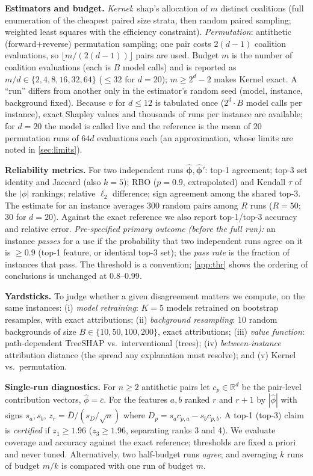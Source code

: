 \documentclass{article}
\newcommand{\phihat}{\hat{\boldsymbol\phi}}
\begin{document}
\textbf{Estimators and budget.} \emph{Kernel}: shap's allocation of $m$ distinct coalitions (full enumeration of the cheapest paired size strata, then random paired sampling; weighted least squares with the efficiency constraint). \emph{Permutation}: antithetic (forward+reverse) permutation sampling; one pair costs $2(d{-}1)$ coalition evaluations, so $\lfloor m/(2(d{-}1))\rfloor$ pairs are used. Budget $m$ is the number of coalition evaluations (each is $B$ model calls) and is reported as $m/d\in\{2,4,8,16,32,64\}$ ($\le32$ for $d{=}20$); $m\ge2^d-2$ makes Kernel exact. A ``run'' differs from another only in the estimator's random seed (model, instance, background fixed). Because $v$ for $d\le12$ is tabulated once ($2^d\!\cdot\!B$ model calls per instance), exact Shapley values and thousands of runs per instance are available; for $d{=}20$ the model is called live and the reference is the mean of 20 permutation runs of $64d$ evaluations each (an approximation, whose limits are noted in \cref{sec:limits}).

\textbf{Reliability metrics.} For two independent runs $\phihat,\phihat'$: top-1 agreement; top-3 set identity and Jaccard (also $k{=}5$); RBO ($p{=}0.9$, extrapolated) and Kendall $\tau$ of the $|\phi|$ rankings; relative $\ell_2$ difference; sign agreement among the shared top-3. The estimate for an instance averages 300 random pairs among $R$ runs ($R{=}50$; $30$ for $d{=}20$). Against the exact reference we also report top-1/top-3 accuracy and relative error.
\emph{Pre-specified primary outcome (before the full run):} an instance \emph{passes} for a use if the probability that two independent runs agree on it is $\ge0.9$ (top-1 feature, or identical top-3 set); the \emph{pass rate} is the fraction of instances that pass. The threshold is a convention; \cref{app:thr} shows the ordering of conclusions is unchanged at $0.8$--$0.99$.

\textbf{Yardsticks.} To judge whether a given disagreement matters we compute, on the same instances: (i) \emph{model retraining}: $K{=}5$ models retrained on bootstrap resamples, with exact attributions; (ii) \emph{background resampling}: 10 random backgrounds of size $B\in\{10,50,100,200\}$, exact attributions; (iii) \emph{value function}: path-dependent TreeSHAP vs.\ interventional (trees); (iv) \emph{between-instance} attribution distance (the spread any explanation must resolve); and (v) Kernel vs.\ permutation.

\textbf{Single-run diagnostics.} For $n\ge2$ antithetic pairs let $c_p\in\mathbb{R}^d$ be the pair-level contribution vectors, $\hat\phi=\bar c$. For the features $a,b$ ranked $r$ and $r{+}1$ by $|\hat\phi|$ with signs $s_a,s_b$, $z_r=\overline{D}/(s_D/\sqrt n)$ where $D_p=s_ac_{p,a}-s_bc_{p,b}$. A top-1 (top-3) claim is \emph{certified} if $z_1\ge1.96$ ($z_3\ge1.96$, separating ranks 3 and 4). We evaluate coverage and accuracy against the exact reference; thresholds are fixed a priori and never tuned. Alternatively, two half-budget runs \emph{agree}; and averaging $k$ runs of budget $m/k$ is compared with one run of budget $m$.
\end{document}
